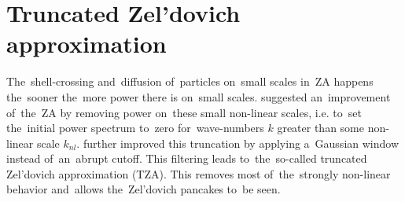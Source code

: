 \section{Truncated Zel'dovich approximation}
The~shell-crossing and~diffusion of~particles on~small scales in~ZA happens the~sooner the~more power there is on~small scales. \textcite{1993MNRAS.260..765C} suggested an~improvement of~the~ZA by removing power on~these small non-linear scales, i.e. to~set the~initial power spectrum to~zero for~wave-numbers $k$ greater than some non-linear scale $k_{nl}$. \textcite{doi:10.1093/mnras/269.3.626} further improved this truncation by applying a~Gaussian window instead of~an~abrupt cutoff. This filtering leads to~the~so-called truncated Zel'dovich approximation (TZA). This removes most of~the~strongly non-linear behavior and~allows the~Zel’dovich pancakes to~be seen.

